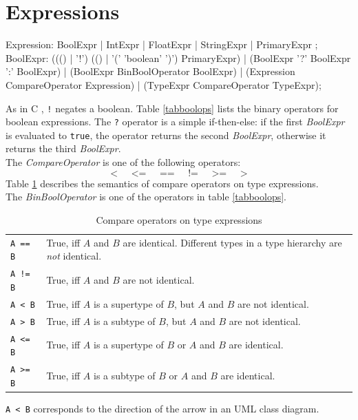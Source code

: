 \section{Expressions}
\label{expressions}
\begin{rail}
  Expression: BoolExpr | IntExpr | FloatExpr | StringExpr | PrimaryExpr ;  
  BoolExpr: ((() | '!') (() | '(' 'boolean' ')') PrimaryExpr) | (BoolExpr '?' BoolExpr ':' BoolExpr) | (BoolExpr BinBoolOperator BoolExpr) | (Expression CompareOperator Expression) | (TypeExpr CompareOperator TypeExpr);
\end{rail}
As in C \cite{isoc}, \texttt{!} negates a boolean. Table \ref{tabboolops} lists the binary operators for boolean expressions. The \texttt{?} operator is a simple if-then-else: if the first \emph{BoolExpr} is evaluated to \texttt{true}, the operator returns the second \emph{BoolExpr}, otherwise it returns the third \emph{BoolExpr}.\\
The \emph{CompareOperator} is one of the following operators:
\[ \texttt{<} \;\;\;\;\; \texttt{<=} \;\;\;\;\; \texttt{==} \;\;\;\;\; \texttt{!=} \;\;\;\;\; \texttt{>=} \;\;\;\;\; \texttt{>} \]
Table \ref{compandtypes} describes the semantics of compare operators on type expressions.\\
The \emph{BinBoolOperator} is one of the operators in table \ref{tabboolops}.
\begin{table}[htbp]
\label{compandtypes} 
  \centering
  \begin{tabularx}{\linewidth}{|l|X|} \hline
    \texttt{A == B} & True, iff $A$ and $B$ are identical. Different types in a type hierarchy are \emph{not} identical. \\
    \texttt{A != B} & True, iff $A$ and $B$ are not identical. \\
    \texttt{A < B} & True, iff $A$ is a supertype of $B$, but $A$ and $B$ are not identical. \\
    \texttt{A > B} & True, iff $A$ is a subtype of $B$, but $A$ and $B$ are not identical. \\
    \texttt{A <= B} & True, iff $A$ is a supertype of $B$ or $A$ and $B$ are identical. \\
    \texttt{A >= B} & True, iff $A$ is a subtype of $B$ or $A$ and $B$ are identical. \\ \hline
  \end{tabularx}
  \caption{Compare operators on type expressions}
\end{table}
\begin{note}
  \texttt{A < B} corresponds to the direction of the arrow in an UML class diagram.
\end{note}

